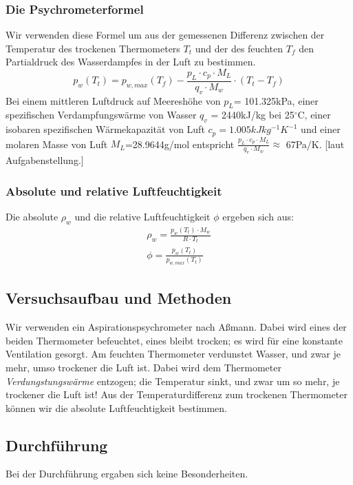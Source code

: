 \documentclass{article}
\begin{document}
\subsubsection*{Die Psychrometerformel}
Wir verwenden diese Formel um aus der gemessenen Differenz zwischen der Temperatur des trockenen Thermometers $T_t$ und der des feuchten $T_f$ den Partialdruck des Wasserdampfes in der Luft zu bestimmen.
\begin{equation}
\label{psychro}
p_w(T_t)=p_{w,max}(T_f)-\frac{p_L\cdot c_p \cdot M_L}{q_v\cdot M_w} \cdot (T_t - T_f)
\end{equation}
Bei einem mittleren Luftdruck auf Meereshöhe von $p_L$= 101.325kPa, einer spezifischen Verdampfungswärme von Wasser $q_v$ = 2440kJ/kg bei 25$^\circ$C, einer isobaren spezifischen Wärmekapazität von Luft $c_p=1.005kJkg^{-1}K^{-1}$ und einer molaren Masse von Luft $M_L$=28.9644g/mol entspricht $\frac{p_L\cdot c_p \cdot M_L}{q_v\cdot M_w} \approx $ 67Pa/K. [laut Aufgabenstellung.]
\subsubsection*{Absolute und relative Luftfeuchtigkeit}
Die absolute $\rho_w$ und die relative Luftfeuchtigkeit $\phi$ ergeben sich aus:
\begin{gather}
\label{abs}
\rho_w=\frac{p_w(T_t)\cdot M_w}{R\cdot T_t} \\
\label{rel}
\phi=\frac{p_w(T_t)}{p_{w,max}(T_t)}
\end{gather}
\subsection{Versuchsaufbau und Methoden}
Wir verwenden ein Aspirationspsychrometer nach Aßmann. Dabei wird eines der beiden Thermometer befeuchtet, eines bleibt trocken; es wird für eine konstante Ventilation gesorgt. Am feuchten Thermometer verdunstet Wasser, und zwar je mehr, umso trockener die Luft ist. Dabei wird dem Thermometer \textit{Verdungstungswärme} entzogen; die Temperatur sinkt, und zwar um so mehr, je trockener die Luft ist! Aus der Temperaturdifferenz zum trockenen Thermometer können wir die absolute Luftfeuchtigkeit bestimmen. 
\subsection{Durchführung}
Bei der Durchführung ergaben sich keine Besonderheiten. 
\end{document}
